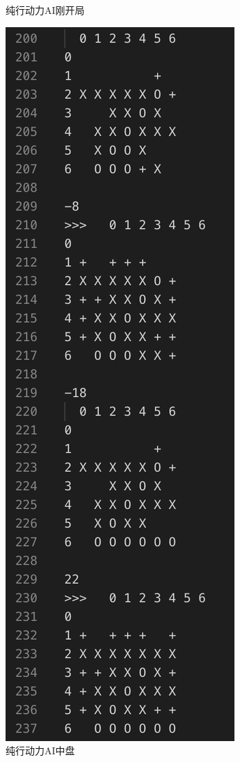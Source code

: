 \documentclass[a4paper]{article}
\begin{document}
\begin{figure}[!hbt]
\begin{minipage}{0.4\textwidth}
\caption{纯行动力AI刚开局} \label{fig:ode0}
\end{minipage}\hfill
\begin{minipage}{0.4\textwidth}
    \centering
    \includegraphics[width=\linewidth]{assets/ode1.png}
\caption{纯行动力AI中盘} \label{fig:ode1}
\end{minipage}
\end{figure}
\end{document}
